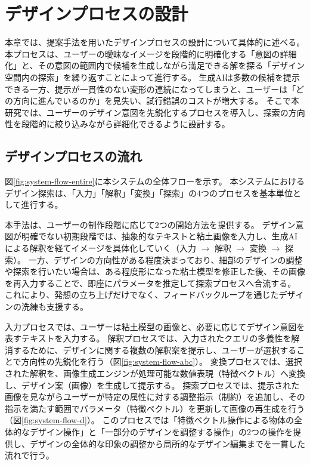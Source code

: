 \documentclass{kuisthesis}
\begin{document}
\section{デザインプロセスの設計}
本章では、提案手法を用いたデザインプロセスの設計について具体的に述べる。
本プロセスは、ユーザーの曖昧なイメージを段階的に明確化する「意図の詳細化」と、その意図の範囲内で候補を生成しながら満足できる解を探る「デザイン空間内の探索」を繰り返すことによって進行する。
生成AIは多数の候補を提示できる一方、提示が一貫性のない変形の連続になってしまうと、ユーザーは「どの方向に進んでいるのか」を見失い、試行錯誤のコストが増大する。
そこで本研究では、ユーザーのデザイン意図を先鋭化するプロセスを導入し、探索の方向性を段階的に絞り込みながら詳細化できるように設計する。

\subsection{デザインプロセスの流れ}
図\ref{fig:system-flow-entire}に本システムの全体フローを示す。
本システムにおけるデザイン探索は、「入力」「解釈」「変換」「探索」の4つのプロセスを基本単位として進行する。

本手法は、ユーザーの制作段階に応じて2つの開始方法を提供する。
デザイン意図が明確でない初期段階では、抽象的なテキストと粘土画像を入力し、生成AIによる解釈を経てイメージを具体化していく（入力 $\to$ 解釈 $\to$ 変換 $\to$ 探索）。
一方、デザインの方向性がある程度決まっており、細部のデザインの調整や探索を行いたい場合は、ある程度形になった粘土模型を修正した後、その画像を再入力することで、即座にパラメータを推定して探索プロセスへ合流する。
これにより、発想の立ち上げだけでなく、フィードバックループを通じたデザインの洗練も支援する。

入力プロセスでは、ユーザーは粘土模型の画像と、必要に応じてデザイン意図を表すテキストを入力する。 
解釈プロセスでは、入力されたクエリの多義性を解消するために、デザインに関する複数の解釈案を提示し、ユーザーが選択することで方向性の先鋭化を行う（図\ref{fig:system-flow-abc}）。 
変換プロセスでは、選択された解釈を、画像生成エンジンが処理可能な数値表現（特徴ベクトル）へ変換し、デザイン案（画像）を生成して提示する。 
探索プロセスでは、提示された画像を見ながらユーザーが特定の属性に対する調整指示（制約）を追加し、その指示を満たす範囲でパラメータ（特徴ベクトル）を更新して画像の再生成を行う（図\ref{fig:system-flow-d}）。 
このプロセスでは「特徴ベクトル操作による物体の全体的なデザイン操作」と「一部分のデザインを調整する操作」の2つの操作を提供し、デザインの全体的な印象の調整から局所的なデザイン編集までを一貫した流れで行う。
\end{document}
